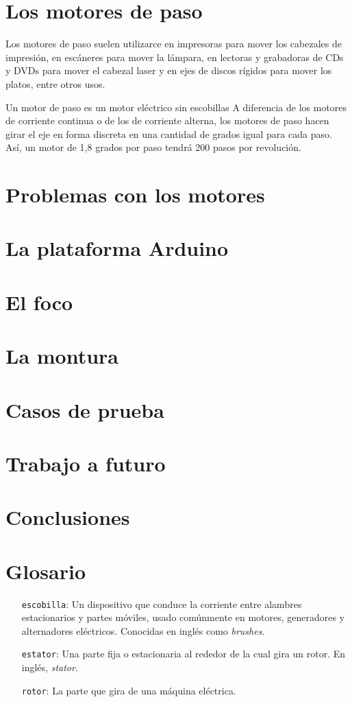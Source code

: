 \documentclass[final,narroweqnarray,inline,twoside]{ieee}
\begin{document}
\section{Los motores de paso}
Los motores de paso suelen utilizarce en impresoras para mover los cabezales de impresión, en escáneres para mover la
lámpara, en lectoras y grabadoras de CDs y DVDs para mover el cabezal laser y en ejes de discos rígidos para mover los
platos, entre otros usos.

Un motor de paso es un motor eléctrico sin escobillas 
A diferencia de los motores de corriente continua o de los de corriente alterna, los motores de paso hacen girar el eje en
forma discreta en una cantidad de grados igual para cada paso. Así, un motor de 1,8 grados por paso tendrá 200 pasos por
revolución.



\section{Problemas con los motores}
\section{La plataforma Arduino}
\section{El foco}
\section{La montura}
\section{Casos de prueba}

\section{Trabajo a futuro}

\section{Conclusiones}
\section{Glosario}
\begin{enumerate}
 \item[\texttt{escobilla}:] Un dispositivo que conduce la corriente entre alambres estacionarios y partes móviles, usado
comúnmente en motores, generadores y alternadores eléctricos. Conocidas en inglés como \textit{brushes}.
 \item[\texttt{estator}:] Una parte fija o estacionaria al rededor de la cual gira un rotor. En inglés, \textit{stator}.
 \item[\texttt{rotor}:] La parte que gira de una máquina eléctrica.
\end{enumerate}
\end{document}
